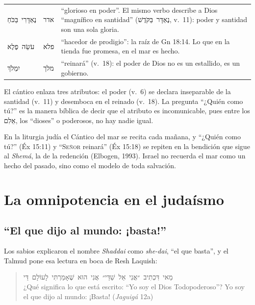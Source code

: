 \documentclass[11pt,letterpaper]{article}
\newcommand{\heb}[1]{\mbox{\foreignlanguage{hebrew}{#1}}}
\newcommand{\SENOR}{\textsc{Señor}}
\begin{document}
\begin{filologia}[Éx 15:6, 11, 18]
\begin{tabular}{@{}L{3.2cm}L{1.6cm}L{10cm}@{}}
\heb{נֶאְדָּרִי בַּכֹּחַ} & \heb{אדר} & ``glorioso en poder''. El mismo verbo describe a Dios ``magnífico en santidad'' (\heb{נֶאְדָּר בַּקֹּדֶשׁ}, v.~11): poder y santidad son una sola gloria. \\[2pt]
\heb{עֹשֵׂה פֶלֶא} & \heb{פלא} & ``hacedor de prodigio'': la raíz de Gn 18:14. Lo que en la tienda fue promesa, en el mar es hecho. \\[2pt]
\heb{יִמְלֹךְ} & \heb{מלך} & ``reinará'' (v.~18): el poder de Dios no es un estallido, es un gobierno. \\
\end{tabular}
\end{filologia}

El cántico enlaza tres atributos: el poder (v.~6) se declara inseparable de la santidad (v.~11) y desemboca en el reinado (v.~18). La pregunta ``¿Quién como tú?'' es la manera bíblica de decir que el atributo es incomunicable, pues entre los \heb{אֵלִם}, los ``dioses'' o poderosos, no hay nadie igual.

\begin{nota}[Precisión]
En la liturgia judía el Cántico del mar se recita cada mañana, y ``¿Quién como tú?'' (Éx 15:11) y ``\SENOR{} reinará'' (Éx 15:18) se repiten en la bendición que sigue al \emph{Shemá}, la de la redención (Elbogen, 1993). Israel no recuerda el mar como un hecho del pasado, sino como el modelo de toda salvación.
\end{nota}

\section{La omnipotencia en el judaísmo}\label{sec:judaismo-omni}

\subsection{``El que dijo al mundo: ¡basta!''}

Los sabios explicaron el nombre \emph{Shaddai} como \emph{she-dai}, ``el que basta'', y el Talmud pone esa lectura en boca de Resh Laquish:

\begin{quote}\small
\heb{מַאי דִּכְתִיב ״אֲנִי אֵל שַׁדַּי״ אֲנִי הוּא שֶׁאָמַרְתִּי לָעוֹלָם דַּי}\\
¿Qué significa lo que está escrito: ``Yo soy el Dios Todopoderoso''? Yo soy el que dijo al mundo: ¡Basta! (\emph{Jaguigá} 12a)
\end{quote}
\end{document}
